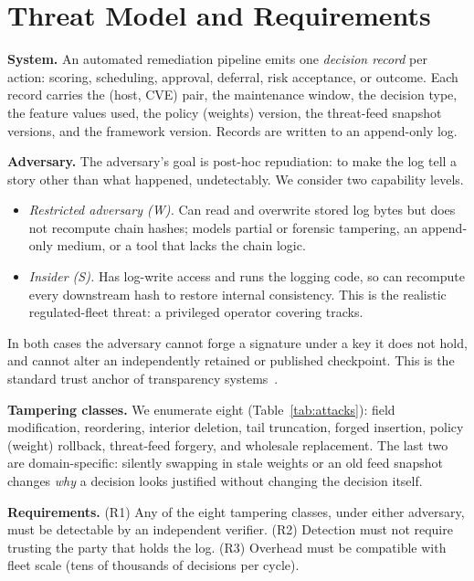 \documentclass[journal]{IEEEtran}
\begin{document}
\section{Threat Model and Requirements}
\label{sec:threat}
\textbf{System.} An automated remediation pipeline emits one
\emph{decision record} per action: scoring, scheduling, approval, deferral,
risk acceptance, or outcome. Each record carries the (host, CVE) pair, the
maintenance window, the decision type, the feature values used, the policy
(weights) version, the threat-feed snapshot versions, and the framework
version. Records are written to an append-only log.

\textbf{Adversary.} The adversary's goal is post-hoc repudiation: to make
the log tell a story other than what happened, undetectably. We consider two
capability levels.
\begin{itemize}
\item \emph{Restricted adversary (W).} Can read and overwrite stored log
bytes but does not recompute chain hashes; models partial or forensic
tampering, an append-only medium, or a tool that lacks the chain logic.
\item \emph{Insider (S).} Has log-write access and runs the logging code, so
can recompute every downstream hash to restore internal consistency. This is
the realistic regulated-fleet threat: a privileged operator covering tracks.
\end{itemize}
In both cases the adversary cannot forge a signature under a key it does not
hold, and cannot alter an independently retained or published checkpoint.
This is the standard trust anchor of transparency systems~\cite{rfc6962}.

\textbf{Tampering classes.} We enumerate eight (Table~\ref{tab:attacks}):
field modification, reordering, interior deletion, tail truncation, forged
insertion, policy (weight) rollback, threat-feed forgery, and wholesale
replacement. The last two are domain-specific: silently swapping in stale
weights or an old feed snapshot changes \emph{why} a decision looks
justified without changing the decision itself.

\textbf{Requirements.} (R1) Any of the eight tampering classes, under either
adversary, must be detectable by an independent verifier. (R2) Detection
must not require trusting the party that holds the log. (R3) Overhead must be
compatible with fleet scale (tens of thousands of decisions per cycle).
\end{document}

